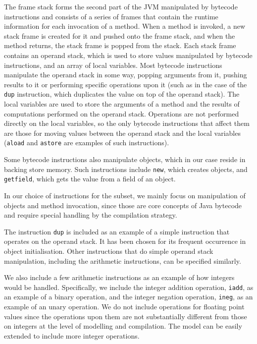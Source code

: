 The frame stack forms the second part of the JVM manipulated by
bytecode instructions and consists of a series of frames that contain
the runtime information for each invocation of a method.
When a method is invoked, a new stack frame is created for it and
pushed onto the frame stack, and when the method returns, the stack
frame is popped from the stack.
Each stack frame contains an operand stack, which is used to store
values manipulated by bytecode instructions, and an array of local
variables.
Most bytecode instructions manipulate the operand stack in some way,
popping arguments from it, pushing results to it or performing
specific operations upon it (such as in the case of the \texttt{dup}
instruction, which duplicates the value on top of the operand stack).
The local variables are used to store the arguments of a method and
the results of computations performed on the operand stack.
Operations are not performed directly on the local variables, so the
only bytecode instructions that affect them are those for moving
values between the operand stack and the local variables
(\texttt{aload} and \texttt{astore} are examples of such
instructions).

Some bytecode instructions also manipulate objects, which in our case
reside in backing store memory.
Such instructions include \texttt{new}, which creates objects, and
\texttt{getfield}, which gets the value from a field of an object.

In our choice of instructions for the subset, we mainly focus on
manipulation of objects and method invocation, since those are core
concepts of Java bytecode and require special handling by the
compilation strategy.

The instruction \texttt{dup} is included as an example of a simple
instruction that operates on the operand stack.
It has been chosen for its frequent occurrence in object initialisation.
Other instructions that do simple operand stack manipulation,
including the arithmetic instructions, can be specified similarly.

We also include a few arithmetic instructions as an example of how
integers would be handled.
Specifically, we include the integer addition operation,
\texttt{iadd}, as an example of a binary operation, and the integer
negation operation, \texttt{ineg}, as an example of an unary
operation.
We do not include operations for floating point values since the
operations upon them are not substantially different from those on
integers at the level of modelling and compilation.
The model can be easily extended to include more integer operations.


